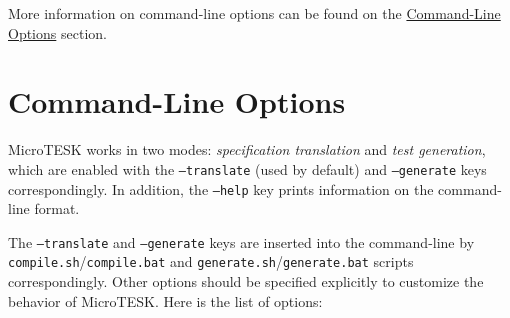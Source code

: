 \documentclass[oneside,final,12pt]{extreport}
\begin{document}
More information on command-line options can be found on the
\hyperref[Command_Line_Options]{Command-Line Options} section.

\section{Command-Line Options}
\label{Command_Line_Options}

MicroTESK works in two modes: \emph{specification translation} and \emph{test generation},
which are enabled with the \texttt{--translate} (used by default) and \texttt{--generate} keys
correspondingly. In addition, the \texttt{--help} key prints information on the command-line format.

The \texttt{--translate} and \texttt{--generate} keys are inserted into the command-line by
\texttt{compile.sh}/\texttt{compile.bat} and \texttt{generate.sh}/\texttt{generate.bat} scripts
correspondingly. Other options should be specified explicitly to customize the behavior of MicroTESK.
Here is the list of options:\\
\end{document}
